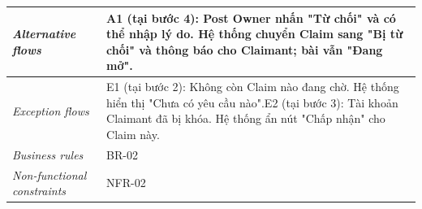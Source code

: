 \begin{longtable}[]{@{}|>{\raggedright\arraybackslash}p{}|>{\raggedright\arraybackslash}p{}|@{}}
\emph{Alternative flows} & A1 (tại bước 4): Post Owner nhấn "Từ chối" và có thể nhập lý do. Hệ thống chuyển Claim sang "Bị từ chối" và thông báo cho Claimant; bài vẫn "Đang mở". \\ \hline
\emph{Exception flows} & E1 (tại bước 2): Không còn Claim nào đang chờ. Hệ thống hiển thị "Chưa có yêu cầu nào".\newline E2 (tại bước 3): Tài khoản Claimant đã bị khóa. Hệ thống ẩn nút "Chấp nhận" cho Claim này. \\ \hline
\emph{Business rules} & BR-02 \\ \hline
\emph{Non-functional constraints} & NFR-02 \\ \hline
\end{longtable}
